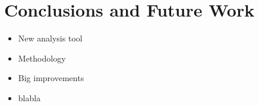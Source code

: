 
\section{Conclusions and Future Work}
\label{sec:concl}

\begin{itemize}
    \item New analysis tool
    \item Methodology
    \item Big improvements
    \item blabla
\end{itemize}


